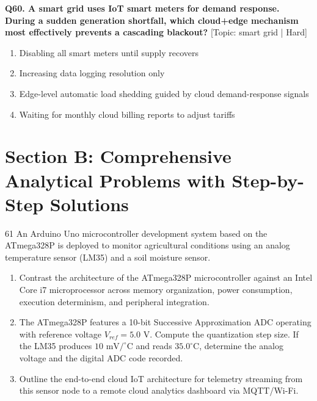 \noindent\textbf{Q60. A smart grid uses IoT smart meters for demand response. During a sudden generation shortfall, which cloud+edge mechanism most effectively prevents a cascading blackout?} \hfill [Topic: smart grid | Hard]
\begin{enumerate}[label=(\alph*),topsep=2pt,itemsep=1pt,partopsep=0pt,parsep=0pt]
    \item {Disabling all smart meters until supply recovers}
    \item {Increasing data logging resolution only}
    \item {Edge-level automatic load shedding guided by cloud demand-response signals}
    \item {Waiting for monthly cloud billing reports to adjust tariffs}
\end{enumerate}
\vspace{2mm}


\newpage
\section{Section B: Comprehensive Analytical Problems with Step-by-Step Solutions}

\begin{subjectiveq}{6}{1}
An Arduino Uno microcontroller development system based on the ATmega328P is deployed to monitor agricultural conditions using an analog temperature sensor (LM35) and a soil moisture sensor.\begin{enumerate}[label=(\alph*)]\item Contrast the architecture of the ATmega328P microcontroller against an Intel Core i7 microprocessor across memory organization, power consumption, execution determinism, and peripheral integration.\item The ATmega328P features a 10-bit Successive Approximation ADC operating with reference voltage $V_{ref} = 5.0\text{ V}$. Compute the quantization step size. If the LM35 produces $10\text{ mV}/^\circ\text{C}$ and reads $35.0^\circ\text{C}$, determine the analog voltage and the digital ADC code recorded.\item Outline the end-to-end cloud IoT architecture for telemetry streaming from this sensor node to a remote cloud analytics dashboard via MQTT/Wi-Fi.\end{enumerate}
\end{subjectiveq}

